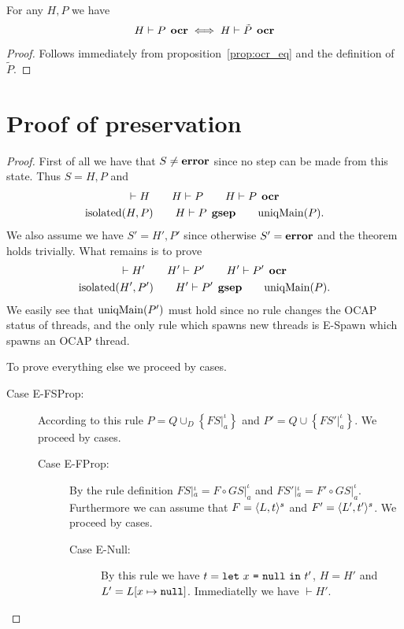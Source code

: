\begin{proposition} \label{prop:ocrtilde_eq}
  For any $H, P$ we have
  \begin{equation*}
    H \vdash P \:\: \mbox{\bf ocr} \iff H \vdash \tilde{P} \:\: \mbox{\bf ocr}
  \end{equation*}
\end{proposition}
\begin{proof}
  Follows immediately from proposition~\ref{prop:ocr_eq} and the definition of
  $\tilde{P}$.
\end{proof}


\section{Proof of preservation}
\label{sec:proof_of_preservation}

\begin{proof} 
  First of all we have that $S \neq \mbox{{\bf error}}$ since no step can be made from this
  state. Thus $S = H, P$ and
  \begin{equation*}
    \begin{gathered}
      \vdash H \quad\quad H \vdash P \quad\quad H \vdash P \:\: \mbox{\bf ocr} \\
      \mbox{$\mathrm{isolated}$}{(H, P)} \quad\quad H \vdash P \:\: \mbox{\bf gsep} \quad\quad \mbox{$\mathrm{uniqMain}$}(P).
    \end{gathered}
  \end{equation*}
  We also assume we have $S' = H', P'$ since otherwise $S' = \mbox{{\bf error}}$ and the
  theorem holds trivially. What remains is to prove
  \begin{equation*}
    \begin{gathered}
      \vdash H' \quad\quad H' \vdash P' \quad\quad H' \vdash P' \:\: \mbox{\bf ocr} \\
      \mbox{$\mathrm{isolated}$}{(H', P')} \quad\quad H' \vdash P' \:\: \mbox{\bf gsep} \quad\quad
      \mbox{$\mathrm{uniqMain}$}(P).
    \end{gathered}
  \end{equation*}
  We easily see that $\mbox{$\mathrm{uniqMain}$}(P')$ must hold since no rule changes the OCAP
  status of threads, and the only rule which spawns new threads is {\sc E-Spawn}
  which spawns an OCAP thread.

  To prove everything else we proceed by cases.
  \begin{description}
    \item[Case {\sc E-FSProp}:] According to this rule $P = Q \cup_D \left\{
        FS|_a^\iota \right\}$ and $P' = Q \cup \left\{ FS'|_a^\iota \right\}$. We proceed by cases.
      \begin{description}
        \item[Case {\sc E-FProp}:] By the rule definition $FS|_a^\iota = F \circ
          GS|_a^\iota$ and $FS'|_a^\iota = F' \circ GS|_a^\iota$. Furthermore we can assume
          that $F = \mbox{$\langle L, t \rangle^s$}$ and $F' = \mbox{$\langle L', t' \rangle^s$}$.
          We proceed by cases.
          \begin{description}
            \item[Case {\sc E-Null}:] By this rule we have $t =
              \mbox{\mdseries\texttt{let}~$x$~\texttt{=}~$\mbox{\mdseries\texttt{null}}$~\texttt{in}~$t'$}$, $H = H'$ and $L' = L[x \mapsto \mbox{\mdseries\texttt{null}}]$.
              Immediatelly we have $\vdash H'$.


\end{description}
\end{description}
\end{description}
\end{proof}
